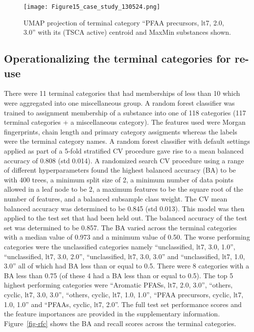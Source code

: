\documentclass[
  super,
  preprint,
  3p]{elsarticle}
\begin{document}
\begin{figure}[H]

{\centering \texttt{[image: Figure15\_case\_study\_130524.png]}

}

\caption{\label{fig-case-study}UMAP projection of terminal category
``PFAA precursors, lt7, 2.0, 3.0'' with its (TSCA active) centroid and
MaxMin substances shown.}

\end{figure}

\hypertarget{operationalizing-the-terminal-categories-for-re-use-1}{%
\subsection{Operationalizing the terminal categories for
re-use}\label{operationalizing-the-terminal-categories-for-re-use-1}}

There were 11 terminal categories that had memberships of less than 10
which were aggregated into one miscellaneous group. A random forest
classifier was trained to assignment membership of a substance into one
of 118 categories (117 terminal categories + a miscellaneous category).
The features used were Morgan fingerprints, chain length and primary
category assigments whereas the labels were the terminal category names.
A random forest classifier with default settings applied as part of a
5-fold stratified CV procedure gave rise to a mean balanced accuracy of
0.808 (std 0.014). A randomized search CV procedure using a range of
different hyperparameters found the highest balanced accuracy (BA) to be
with 400 trees, a minimum split size of 2, a minimum number of data
points allowed in a leaf node to be 2, a maximum features to be the
square root of the number of features, and a balanced subsample class
weight. The CV mean balanced accuracy was determined to be 0.845 (std
0.013). This model was then applied to the test set that had been held
out. The balanced accuracy of the test set was determined to be 0.857.
The BA varied across the terminal categories with a median value of
0.973 and a minimum value of 0.50. The worse performing categories were
the unclassified categories namely ``unclassified, lt7, 3.0, 1.0'',
``unclassified, lt7, 3.0, 2.0'', ``unclassified, lt7, 3.0, 3.0'' and
``unclassified, lt7, 1.0, 3.0'' all of which had BA less than or equal
to 0.5. There were 8 categories with a BA less than 0.75 (of these 4 had
a BA less than or equal to 0.5). The top 5 highest performing categories
were ``Aromatic PFASs, lt7, 2.0, 3.0'', ``others, cyclic, lt7, 3.0,
3.0'', ``others, cyclic, lt7, 1.0, 1.0'', ``PFAA precursors, cyclic,
lt7, 1.0, 1.0'' and ``PFAAs, cyclic, lt7, 2.0''. The full test set
performance scores and the feature importances are provided in the
supplementary information. Figure~\ref{fig-rfc} shows the BA and recall
scores across the terminal categories.
\end{document}
